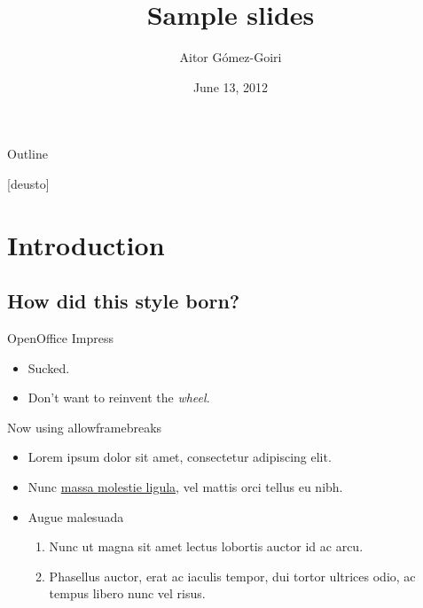 \documentclass{beamer} %
\title{Sample slides}
\author{Aitor Gómez-Goiri}
\institute{DeustoTech - Deusto Institute of Technology, University of Deusto
\url{http://www.morelab.deusto.es}}
\date{June 13, 2012}
\begin{document}
  \owntitlepage

  \begin{frame}{Outline}
    \transwipe
  \end{frame}

[deusto]
\section{Introduction}

  \subsection{How did this style born?}
  
  \begin{frame}{OpenOffice Impress}
    \begin{itemize}
	\item Sucked.
	\pause
	\item Don't want to reinvent the \emph{wheel}.
    \end{itemize}
  \end{frame}
  

  \begin{frame}[allowframebreaks]{Now using allowframebreaks}
    \begin{itemize}
      \item Lorem ipsum dolor sit amet, consectetur adipiscing elit.
      \item Nunc \href{http://www.deusto.es/}{massa molestie ligula}, vel mattis orci tellus eu nibh.
      \framebreak
      \item Augue malesuada
      \begin{enumerate}
	  \item Nunc ut magna sit amet lectus lobortis auctor id ac arcu.
	  \item Phasellus auctor, erat ac iaculis tempor, dui tortor ultrices odio, ac tempus libero nunc vel risus.
	\end{enumerate}
    \end{itemize}
  \end{frame}

\end{document}
